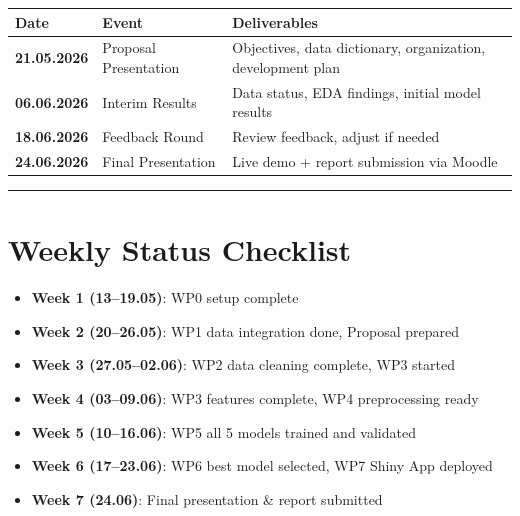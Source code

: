 \documentclass[
  english,
  letterpaper,
  DIV=11,
  numbers=noendperiod]{scrreprt}
\newcounter{none} %
\providecommand{\tightlist}{%
  \setlength{\itemsep}{0pt}\setlength{\parskip}{0pt}}
\begin{document}
{\def\LTcaptype{none} %
\begin{longtable}[]{@{}
  >{\raggedright\arraybackslash}p{}
  >{\raggedright\arraybackslash}p{}
  >{\raggedright\arraybackslash}p{}@{}}
\toprule\noalign{}
\begin{minipage}[b]{\linewidth}\raggedright
Date
\end{minipage} & \begin{minipage}[b]{\linewidth}\raggedright
Event
\end{minipage} & \begin{minipage}[b]{\linewidth}\raggedright
Deliverables
\end{minipage} \\
\midrule\noalign{}
\endhead
\bottomrule\noalign{}
\endlastfoot
\textbf{21.05.2026} & Proposal Presentation & Objectives, data
dictionary, organization, development plan \\
\textbf{06.06.2026} & Interim Results & Data status, EDA findings,
initial model results \\
\textbf{18.06.2026} & Feedback Round & Review feedback, adjust if
needed \\
\textbf{24.06.2026} & Final Presentation & Live demo + report submission
via Moodle \\
\end{longtable}
}

\begin{center}\rule{0.5\linewidth}{0.5pt}\end{center}

\section{Weekly Status Checklist}\label{weekly-status-checklist}

\begin{itemize}
\tightlist
\item[$\square$]
  \textbf{Week 1 (13--19.05)}: WP0 setup complete
\item[$\square$]
  \textbf{Week 2 (20--26.05)}: WP1 data integration done, Proposal
  prepared
\item[$\square$]
  \textbf{Week 3 (27.05--02.06)}: WP2 data cleaning complete, WP3
  started
\item[$\square$]
  \textbf{Week 4 (03--09.06)}: WP3 features complete, WP4 preprocessing
  ready
\item[$\square$]
  \textbf{Week 5 (10--16.06)}: WP5 all 5 models trained and validated
\item[$\square$]
  \textbf{Week 6 (17--23.06)}: WP6 best model selected, WP7 Shiny App
  deployed
\item[$\square$]
  \textbf{Week 7 (24.06)}: Final presentation \& report submitted
\end{itemize}
\end{document}
